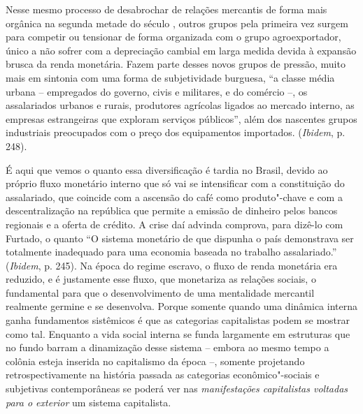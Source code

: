 Nesse mesmo processo de desabrochar de relações mercantis de forma mais
orgânica na segunda metade do século , outros grupos pela primeira
vez surgem para competir ou tensionar de forma organizada com o grupo
agroexportador, único a não sofrer com a depreciação cambial em larga
medida devida à expansão brusca da renda monetária. Fazem parte desses
novos grupos de pressão, muito mais em sintonia com uma forma de
subjetividade burguesa, ``a classe média urbana -- empregados do
governo, civis e militares, e do comércio --, os assalariados urbanos e
rurais, produtores agrícolas ligados ao mercado interno, as empresas
estrangeiras que exploram serviços públicos'', além dos nascentes grupos
industriais preocupados com o preço dos equipamentos importados.
(\emph{Ibidem}, p. 248).

É aqui que vemos o quanto essa diversificação é tardia no Brasil, devido
ao próprio fluxo monetário interno que só vai se intensificar com a
constituição do assalariado, que coincide com a ascensão do café como
produto"-chave e com a descentralização na república que permite a
emissão de dinheiro pelos bancos regionais e a oferta de crédito. A
crise daí advinda comprova, para dizê-lo com Furtado, o quanto ``O
sistema monetário de que dispunha o país demonstrava ser totalmente
inadequado para uma economia baseada no trabalho assalariado.''
(\emph{Ibidem}, p. 245). Na época do regime escravo, o fluxo de renda
monetária era reduzido, e é justamente esse fluxo, que monetariza as
relações sociais, o fundamental para que o desenvolvimento de uma
mentalidade mercantil realmente germine e se desenvolva. Porque somente
quando uma dinâmica interna ganha fundamentos sistêmicos é que as
categorias capitalistas podem se mostrar como tal. Enquanto a vida
social interna se funda largamente em estruturas que no fundo barram a
dinamização desse sistema -- embora ao mesmo tempo a colônia esteja
inserida no capitalismo da época --, somente projetando
retrospectivamente na história passada as categorias econômico"-sociais e
subjetivas contemporâneas se poderá ver nas \emph{manifestações
capitalistas voltadas para o exterior} um sistema capitalista.

